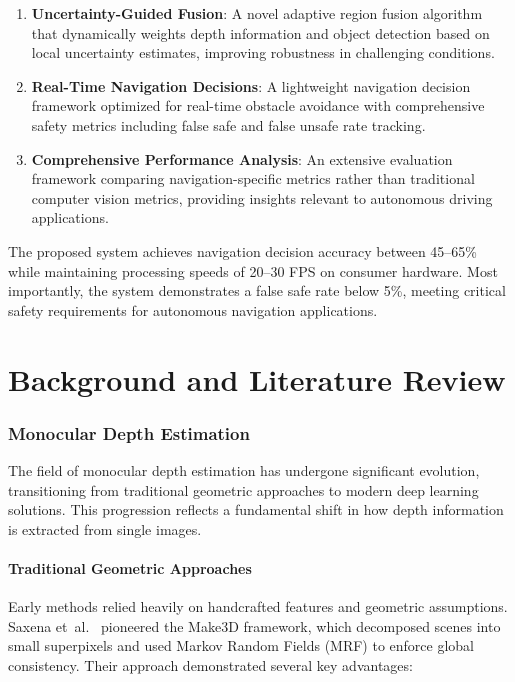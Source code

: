 \documentclass[12pt,oneside]{book}
\begin{document}
\begin{enumerate}
\item \textbf{Uncertainty-Guided Fusion}: A novel adaptive region fusion algorithm that dynamically weights depth information and object detection based on local uncertainty estimates, improving robustness in challenging conditions.

\item \textbf{Real-Time Navigation Decisions}: A lightweight navigation decision framework optimized for real-time obstacle avoidance with comprehensive safety metrics including false safe and false unsafe rate tracking.

\item \textbf{Comprehensive Performance Analysis}: An extensive evaluation framework comparing navigation-specific metrics rather than traditional computer vision metrics, providing insights relevant to autonomous driving applications.
\end{enumerate}

The proposed system achieves navigation decision accuracy between 45--65\% while maintaining processing speeds of 20--30 FPS on consumer hardware. Most importantly, the system demonstrates a false safe rate below 5\%, meeting critical safety requirements for autonomous navigation applications.

\chapter{Background and Literature Review}

\subsection{Monocular Depth Estimation}

The field of monocular depth estimation has undergone significant evolution, transitioning from traditional geometric approaches to modern deep learning solutions. This progression reflects a fundamental shift in how depth information is extracted from single images.

\subsubsection{Traditional Geometric Approaches}
Early methods relied heavily on handcrafted features and geometric assumptions. Saxena et~al.~\cite{saxena2009make3d} pioneered the Make3D framework, which decomposed scenes into small superpixels and used Markov Random Fields (MRF) to enforce global consistency. Their approach demonstrated several key advantages:
\end{document}
